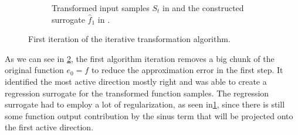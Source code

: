 \documentclass[
  a4paper,  %
  twoside,  %
  bibliography=totoc,
  headsepline,
  cleardoublepage=empty,
  parskip=half,
  draft=false
]{scrbook}
\begin{document}
\begin{mdframed}[style=style]
\begin{figure}[H]
\begin{subfigure}{.5\textwidth}
  \caption{Transformed input samples $S_t$ in \darkblue and the constructed surrogate $\hat{f}_1$ in \red.}
\label{fig:pipeline_local_1}
\end{subfigure}
\delimit
\caption{First iteration of the iterative transformation algorithm.}
\label{fig:pipeline_1}
\end{figure}
\end{mdframed}
%
As we can see in \cref{fig:pipeline_1}, the first algorithm iteration removes a big chunk of the original function $e_0=f$ to reduce the approximation error in the first step.
It identified the most active direction mostly right and was able to create a regression surrogate for the transformed function samples.
The regression surrogate had to employ a lot of regularization, as seen in\cref{fig:pipeline_local_1}, since there is still some function output contribution by the sinus term that will be projected onto the first active direction.
\end{document}
